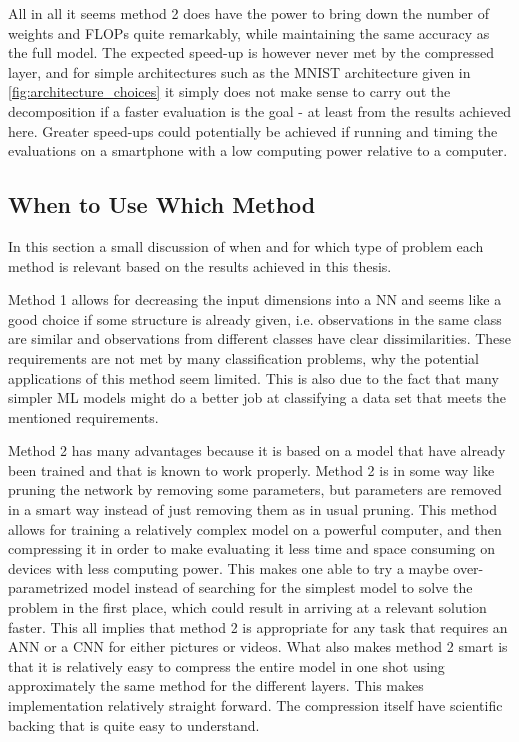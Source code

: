 All in all it seems method 2 does have the power to bring down the number of weights and FLOPs quite remarkably, while maintaining the same accuracy as the full model. The expected speed-up is however never met by the compressed layer, and for simple architectures such as the MNIST architecture given in \autoref{fig:architecture_choices} it simply does not make sense to carry out the decomposition if a faster evaluation is the goal - at least from the results achieved here. Greater speed-ups could potentially be achieved if running and timing the evaluations on a smartphone with a low computing power relative to a computer.

\subsection{When to Use Which Method}
In this section a small discussion of when and for which type of problem each method is relevant based on the results achieved in this thesis.

Method 1 allows for decreasing the input dimensions into a NN and seems like a good choice if some structure is already given, i.e. observations in the same class are similar and observations from different classes have clear dissimilarities. These requirements are not met by many classification problems, why the potential applications of this method seem limited. This is also due to the fact that many simpler ML models might do a better job at classifying a data set that meets the mentioned requirements. 

Method 2 has many advantages because it is based on a model that have already been trained and that is known to work properly. Method 2 is in some way like pruning the network by removing some parameters, but parameters are removed in a smart way instead of just removing them as in usual pruning. This method allows for training a relatively complex model on a powerful computer, and then compressing it in order to make evaluating it less time and space consuming on devices with less computing power. This makes one able to try a maybe over-parametrized model instead of searching for the simplest model to solve the problem in the first place, which could result in arriving at a relevant solution faster. This all implies that method 2 is appropriate for any task that requires an ANN or a CNN for either pictures or videos. What also makes method 2 smart is that it is relatively easy to compress the entire model in one shot using approximately the same method for the different layers. This makes implementation relatively straight forward. The compression itself have scientific backing that is quite easy to understand. 

